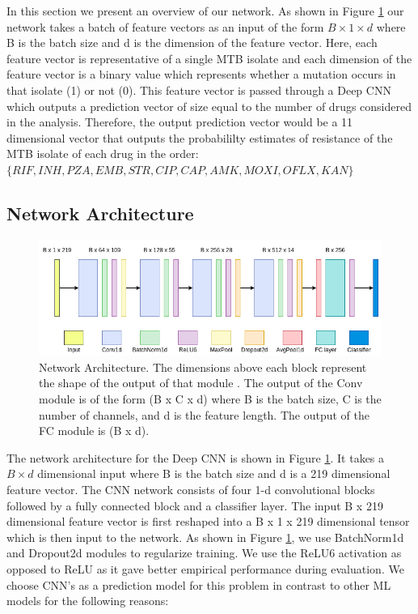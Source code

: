 \documentclass{article}
\begin{document}
In this section we present an overview of our network. As shown in Figure \ref{fig:architecture} our network takes a batch of
feature vectors as an input of the form $B \times 1 \times d$ where B is the batch size and d is the dimension of the feature
vector. Here, each feature vector is representative of a single MTB isolate and each dimension of the feature vector
is a binary value which represents whether a mutation occurs in that isolate (1) or not (0).
This feature vector is passed through a Deep CNN which outputs a prediction vector
of size equal to the number of drugs considered in the analysis. Therefore, the output prediction vector
would be a 11 dimensional vector that outputs the probabililty estimates of resistance of the MTB isolate
of each drug in the order: $\{RIF, INH, PZA, EMB, STR, CIP, CAP, AMK, MOXI, OFLX, KAN\}$

\subsection{Network Architecture}
\begin{figure}[t]
  \centering
  \includegraphics[scale=0.5]{architecture.png}
  \caption{Network Architecture. The dimensions above each block represent the shape of the output of that module
  . The output of the Conv module is of the form (B x C x d) where B is the batch size, C is the number of channels,
  and d is the feature length. The output of the FC module is (B x d).}
  \label{fig:architecture}
\end{figure}

The network architecture for the Deep CNN is shown in Figure \ref{fig:architecture}. It takes a $B \times d$ 
dimensional input where B
is the batch size and d is a 219 dimensional feature vector. The CNN network consists of four 1-d convolutional blocks
followed by a fully connected block and a classifier layer. The input B x 219 dimensional feature vector is 
first reshaped into a B x 1 x 219 dimensional
tensor which is then input to the network. As shown in Figure \ref{fig:architecture}, we use BatchNorm1d \cite{43442}
and Dropout2d \cite{DBLP:journals/corr/TompsonGJLB14} modules
to regularize training. We use the ReLU6 activation as opposed to ReLU as it gave better empirical performance
during evaluation. We choose CNN's as a prediction model for this problem in contrast to other ML models 
for the following reasons:
\end{document}
